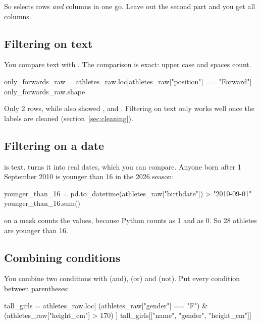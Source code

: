 \documentclass[11pt,a4paper]{article}
\begin{document}
So  selects rows \emph{and} columns in one go.
Leave out the second part and you get all columns.

\subsection{Filtering on text}

You compare text with \code{==}. The comparison is exact: upper case and
spaces count.

\begin{python}
only_forwards_raw = athletes_raw.loc[athletes_raw["position"] == "Forward"]
only_forwards_raw.shape
\end{python}

Only 2 rows, while  also showed ,
 and . Filtering on text only works well
once the labels are cleaned (section~\ref{sec:cleaning}).

\subsection{Filtering on a date}

 is text.  turns it into real
dates, which you can compare. Anyone born after 1 September 2010 is
younger than 16 in the 2026 season:

\begin{python}
younger_than_16 = pd.to_datetime(athletes_raw["birthdate"]) > "2010-09-01"
younger_than_16.sum()
\end{python}

 on a mask counts the  values, because Python
counts  as 1 and  as 0. So 28 athletes are
younger than 16.

\subsection{Combining conditions}

You combine two conditions with \code{\&} (and), \code{|} (or) and
\code{\textasciitilde} (not). Put every condition between parentheses:

\begin{python}
tall_girls = athletes_raw.loc[
    (athletes_raw["gender"] == "F") & (athletes_raw["height_cm"] > 170)
]
tall_girls[["name", "gender", "height_cm"]]
\end{python}
\end{document}
